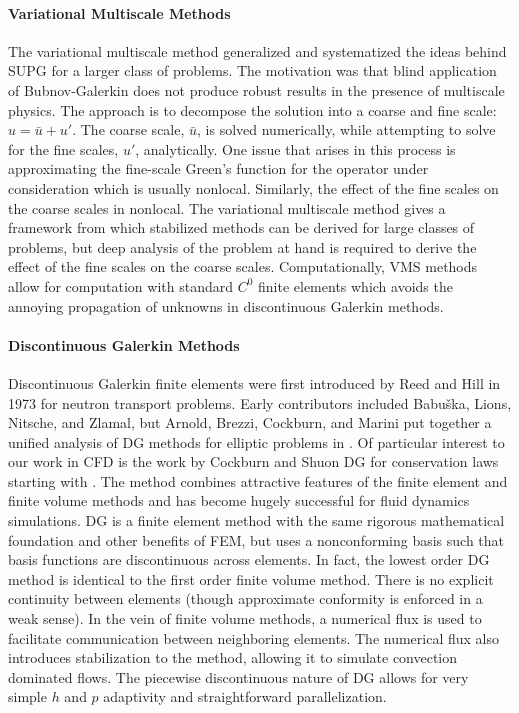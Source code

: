 \documentclass[Proposal.tex]{subfiles}
\begin{document}
\paragraph{Variational Multiscale Methods}
The variational multiscale method generalized and systematized the ideas behind SUPG for a larger class of problems.
The motivation was that blind application of Bubnov-Galerkin does not produce robust results in the presence of multiscale physics\cite{VMS}.
The approach is to decompose the solution into a coarse and fine scale: $u=\bar u+u'$. The coarse scale, $\bar u$, is solved numerically,
while attempting to solve for the fine scales, $u'$, analytically.
One issue that arises in this process is approximating the fine-scale Green's function for the operator under consideration which is usually nonlocal.
Similarly, the effect of the fine scales on the coarse scales in nonlocal.
The variational multiscale method gives a framework from which stabilized methods can be derived for large classes of problems,
but deep analysis of the problem at hand is required to derive the effect of the fine scales on the coarse scales.
Computationally, VMS methods allow for computation with standard $C^0$ finite elements which avoids the annoying propagation of unknowns in
discontinuous Galerkin methods.

\paragraph{Discontinuous Galerkin Methods}
Discontinuous Galerkin finite elements were first introduced by Reed and Hill in 1973 for neutron transport problems\cite{ReedHillDG}.
Early contributors included Babu\v{s}ka, Lions, Nitsche, and Zlamal, but Arnold, Brezzi, Cockburn, and Marini put together a unified analysis
of DG methods for elliptic problems in \cite{ArnoldDG}. 
Of particular interest to our work in CFD is the work by Cockburn and Shuon DG for conservation laws starting with \cite{CockburnShuDG}.
The method combines attractive features of the finite element and finite volume methods and has become hugely successful for fluid dynamics simulations.
DG is a finite element method with the same rigorous mathematical foundation and other benefits of FEM, but uses a nonconforming basis such that basis
functions are discontinuous across elements.
In fact, the lowest order DG method is identical to the first order finite volume method.
There is no explicit continuity between elements (though approximate conformity is enforced in a weak sense). 
In the vein of finite volume methods, a numerical flux is used to facilitate communication between neighboring elements.
The numerical flux also introduces stabilization to the method, allowing it to simulate convection dominated flows.
The piecewise discontinuous nature of DG allows for very simple $h$ and $p$ adaptivity and straightforward parallelization.
\end{document}
